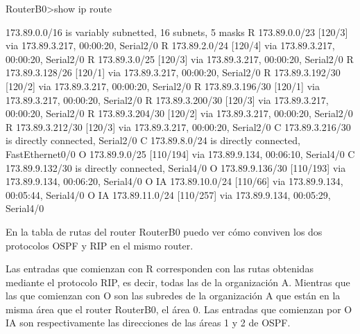 \begin{listing}[style=consola]
RouterB0>show ip route

     173.89.0.0/16 is variably subnetted, 16 subnets, 5 masks
R       173.89.0.0/23 [120/3] via 173.89.3.217, 00:00:20, Serial2/0
R       173.89.2.0/24 [120/4] via 173.89.3.217, 00:00:20, Serial2/0
R       173.89.3.0/25 [120/3] via 173.89.3.217, 00:00:20, Serial2/0
R       173.89.3.128/26 [120/1] via 173.89.3.217, 00:00:20, Serial2/0
R       173.89.3.192/30 [120/2] via 173.89.3.217, 00:00:20, Serial2/0
R       173.89.3.196/30 [120/1] via 173.89.3.217, 00:00:20, Serial2/0
R       173.89.3.200/30 [120/3] via 173.89.3.217, 00:00:20, Serial2/0
R       173.89.3.204/30 [120/2] via 173.89.3.217, 00:00:20, Serial2/0
R       173.89.3.212/30 [120/3] via 173.89.3.217, 00:00:20, Serial2/0
C       173.89.3.216/30 is directly connected, Serial2/0
C       173.89.8.0/24 is directly connected, FastEthernet0/0
O       173.89.9.0/25 [110/194] via 173.89.9.134, 00:06:10, Serial4/0
C       173.89.9.132/30 is directly connected, Serial4/0
O       173.89.9.136/30 [110/193] via 173.89.9.134, 00:06:20, Serial4/0
O IA    173.89.10.0/24 [110/66] via 173.89.9.134, 00:05:44, Serial4/0
O IA    173.89.11.0/24 [110/257] via 173.89.9.134, 00:05:29, Serial4/0
\end{listing}
\par En la tabla de rutas del router RouterB0 puedo ver cómo conviven los dos protocolos OSPF y RIP en el mismo router.
\par Las entradas que comienzan con R corresponden con las rutas obtenidas mediante el protocolo RIP, es decir, todas las de la organización A. Mientras que las que comienzan con O son las subredes de la organización A que están en la misma área que el router RouterB0, el área 0. Las entradas que comienzan por O IA son respectivamente las direcciones de las áreas 1 y 2 de OSPF.



